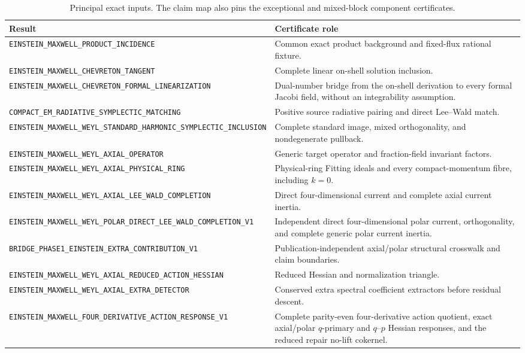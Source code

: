 \documentclass[11pt]{article}
\theoremstyle{remark}
\newcommand{\cert}[1]{\nolinkurl{#1}}
\begin{document}
\begin{table}[ht]
\centering
\scriptsize
\begin{tabular}{p{}p{}}
\toprule
Result & Certificate role\\
\midrule
\cert{EINSTEIN_MAXWELL_PRODUCT_INCIDENCE}
& Common exact product background and fixed-flux rational fixture.\\
\cert{EINSTEIN_MAXWELL_CHEVRETON_TANGENT}
& Complete linear on-shell solution inclusion.\\
\cert{EINSTEIN_MAXWELL_CHEVRETON_FORMAL_LINEARIZATION}
& Dual-number bridge from the on-shell derivation to every formal Jacobi
field, without an integrability assumption.\\
\cert{COMPACT_EM_RADIATIVE_SYMPLECTIC_MATCHING}
& Positive source radiative pairing and direct Lee--Wald match.\\
\cert{EINSTEIN_MAXWELL_WEYL_STANDARD_HARMONIC_SYMPLECTIC_INCLUSION}
& Complete standard image, mixed orthogonality, and nondegenerate pullback.\\
\cert{EINSTEIN_MAXWELL_WEYL_AXIAL_OPERATOR}
& Generic target operator and fraction-field invariant factors.\\
\cert{EINSTEIN_MAXWELL_WEYL_AXIAL_PHYSICAL_RING}
& Physical-ring Fitting ideals and every compact-momentum fibre, including
$k=0$.\\
\cert{EINSTEIN_MAXWELL_WEYL_AXIAL_LEE_WALD_COMPLETION}
& Direct four-dimensional current and complete axial current inertia.\\
\cert{EINSTEIN_MAXWELL_WEYL_POLAR_DIRECT_LEE_WALD_COMPLETION_V1}
& Independent direct four-dimensional polar current, orthogonality, and
complete generic polar current inertia.\\
\cert{BRIDGE_PHASE1_EINSTEIN_EXTRA_CONTRIBUTION_V1}
& Publication-independent axial/polar structural crosswalk and claim
boundaries.\\
\cert{EINSTEIN_MAXWELL_WEYL_AXIAL_REDUCED_ACTION_HESSIAN}
& Reduced Hessian and normalization triangle.\\
\cert{EINSTEIN_MAXWELL_WEYL_AXIAL_EXTRA_DETECTOR}
& Conserved extra spectral coefficient extractors before residual descent.\\
\cert{EINSTEIN_MAXWELL_FOUR_DERIVATIVE_ACTION_RESPONSE_V1}
& Complete parity-even four-derivative action quotient, exact axial/polar
$q$-primary and $q$--$p$ Hessian responses, and the reduced repair no-lift
cokernel.\\
\bottomrule
\end{tabular}
\caption{Principal exact inputs. The claim map also pins the exceptional and
mixed-block component certificates.}
\end{table}
\end{document}
